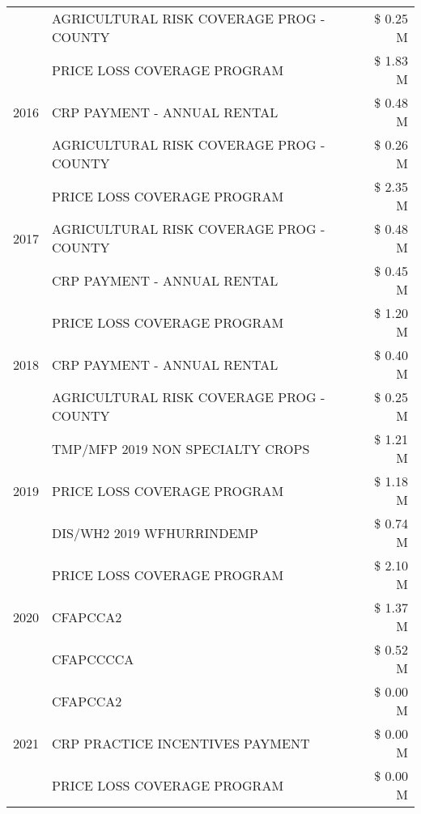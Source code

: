 \begin{tabular}{llr}
 & AGRICULTURAL RISK COVERAGE PROG - COUNTY & \$ 0.25 M \\
\cline{1-3}
\multirow[t]{3}{*}{2016} & PRICE LOSS COVERAGE PROGRAM                   & \$ 1.83 M \\
 & CRP PAYMENT - ANNUAL RENTAL                   & \$ 0.48 M \\
 & AGRICULTURAL RISK COVERAGE PROG - COUNTY      & \$ 0.26 M \\
\cline{1-3}
\multirow[t]{3}{*}{2017} & PRICE LOSS COVERAGE PROGRAM & \$ 2.35 M \\
 & AGRICULTURAL RISK COVERAGE PROG - COUNTY & \$ 0.48 M \\
 & CRP PAYMENT - ANNUAL RENTAL & \$ 0.45 M \\
\cline{1-3}
\multirow[t]{3}{*}{2018} & PRICE LOSS COVERAGE PROGRAM & \$ 1.20 M \\
 & CRP PAYMENT - ANNUAL RENTAL & \$ 0.40 M \\
 & AGRICULTURAL RISK COVERAGE PROG - COUNTY & \$ 0.25 M \\
\cline{1-3}
\multirow[t]{3}{*}{2019} & TMP/MFP 2019 NON SPECIALTY CROPS & \$ 1.21 M \\
 & PRICE LOSS COVERAGE PROGRAM & \$ 1.18 M \\
 & DIS/WH2 2019 WFHURRINDEMP & \$ 0.74 M \\
\cline{1-3}
\multirow[t]{3}{*}{2020} & PRICE LOSS COVERAGE PROGRAM & \$ 2.10 M \\
 & CFAPCCA2 & \$ 1.37 M \\
 & CFAPCCCCA & \$ 0.52 M \\
\cline{1-3}
\multirow[t]{3}{*}{2021} & CFAPCCA2 & \$ 0.00 M \\
 & CRP PRACTICE INCENTIVES PAYMENT & \$ 0.00 M \\
 & PRICE LOSS COVERAGE PROGRAM & \$ 0.00 M \\
\cline{1-3}
\bottomrule
\end{tabular}
